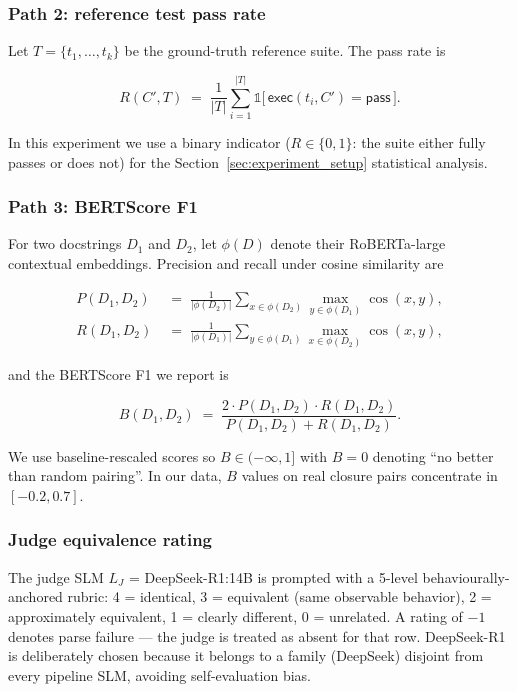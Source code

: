 \subsubsection{Path 2: reference test pass rate}

Let $T = \{t_1, \ldots, t_k\}$ be the ground-truth reference suite. The pass rate is

\begin{equation}
  R(C', T)
  \;=\;
  \frac{1}{|T|}\sum_{i=1}^{|T|} \mathds{1}\!\bigl[\,\textsf{exec}(t_i, C') = \textsf{pass}\,\bigr].
  \label{eq:passrate}
\end{equation}

In this experiment we use a binary indicator ($R \in \{0, 1\}$: the suite either fully passes or does not) for the Section~\ref{sec:experiment_setup} statistical analysis.

\subsubsection{Path 3: BERTScore F1}

For two docstrings $D_1$ and $D_2$, let $\phi(D)$ denote their RoBERTa-large contextual embeddings. Precision and recall under cosine similarity are

\begin{align}
  P(D_1, D_2) &\;=\; \tfrac{1}{|\phi(D_2)|} \textstyle\sum_{x \in \phi(D_2)} \max_{y \in \phi(D_1)} \cos(x, y), \label{eq:bert_p}\\
  R(D_1, D_2) &\;=\; \tfrac{1}{|\phi(D_1)|} \textstyle\sum_{y \in \phi(D_1)} \max_{x \in \phi(D_2)} \cos(x, y), \label{eq:bert_r}
\end{align}

and the BERTScore F1 we report is

\begin{equation}
  B(D_1, D_2)
  \;=\;
  \frac{2 \cdot P(D_1, D_2) \cdot R(D_1, D_2)}{P(D_1, D_2) + R(D_1, D_2)}.
  \label{eq:bertscore}
\end{equation}

We use baseline-rescaled scores so $B \in (-\infty, 1]$ with $B = 0$ denoting ``no better than random pairing''. In our data, $B$ values on real closure pairs concentrate in $[-0.2, 0.7]$.

\subsubsection{Judge equivalence rating}

The judge SLM $L_J$ = DeepSeek-R1:14B is prompted with a 5-level behaviourally-anchored rubric: 4 = identical, 3 = equivalent (same observable behavior), 2 = approximately equivalent, 1 = clearly different, 0 = unrelated. A rating of $-1$ denotes parse failure --- the judge is treated as absent for that row. DeepSeek-R1 is deliberately chosen because it belongs to a family (DeepSeek) disjoint from every pipeline SLM, avoiding self-evaluation bias.


